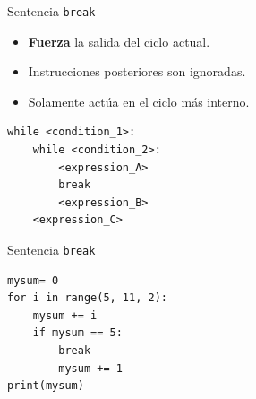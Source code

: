 \documentclass[mathserif]{beamer}
\begin{document}
\begin{frame}[fragile]{Sentencia \lstinline|break|}
    \begin{itemize}
        \item {\blue\bfseries Fuerza} la salida del ciclo actual.
        \item Instrucciones posteriores son ignoradas.
        \item Solamente actúa en el {\blue ciclo más interno}.
    \end{itemize}
\begin{lstlisting}
while <condition_1>:
    while <condition_2>:
        <expression_A>
        break
        <expression_B>
    <expression_C>
\end{lstlisting}
\end{frame}

\begin{frame}[fragile]{Sentencia \lstinline|break|}
\begin{lstlisting}
mysum= 0
for i in range(5, 11, 2):
    mysum += i
    if mysum == 5: 
        break
        mysum += 1 
print(mysum)
\end{lstlisting}

\end{frame}
\end{document}
